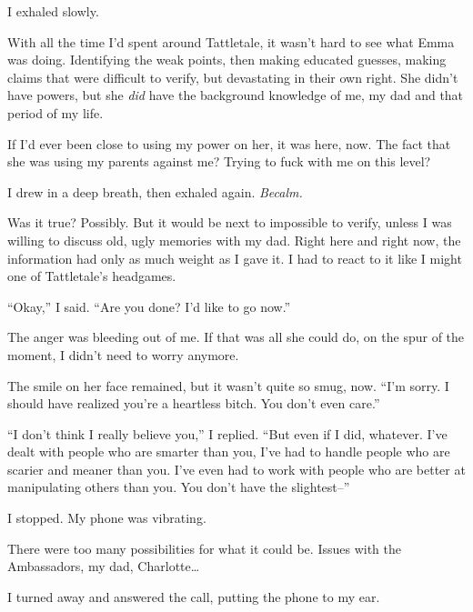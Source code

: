 I exhaled slowly.



With all the time I'd spent around Tattletale, it wasn't hard to see what Emma was doing.  Identifying the weak points, then making educated guesses, making claims that were difficult to verify, but devastating in their own right.  She didn't have powers, but she \emph{did} have the background knowledge of me, my dad and that period of my life.



If I'd ever been close to using my power on her, it was here, now.  The fact that she was using my parents against me?  Trying to fuck with me on this level?



I drew in a deep breath, then exhaled again.  \emph{Be}\emph{calm.}



Was it true?  Possibly.  But it would be next to impossible to verify, unless I was willing to discuss old, ugly memories with my dad.  Right here and right now, the information had only as much weight as I gave it.  I had to react to it like I might one of Tattletale's headgames.



``Okay,'' I said.  ``Are you done?  I'd like to go now.''



The anger was bleeding out of me.  If that was all she could do, on the spur of the moment, I didn't need to worry anymore.



The smile on her face remained, but it wasn't quite so smug, now.  ``I'm sorry.  I should have realized you're a heartless bitch.  You don't even care.''



``I don't think I really believe you,'' I replied.  ``But even if I did, whatever.  I've dealt with people who are smarter than you, I've had to handle people who are scarier and meaner than you.  I've even had to work with people who are better at manipulating others than you.  You don't have the slightest--''



I stopped.  My phone was vibrating.



There were too many possibilities for what it could be.  Issues with the Ambassadors, my dad, Charlotte\ldots



I turned away and answered the call, putting the phone to my ear.



